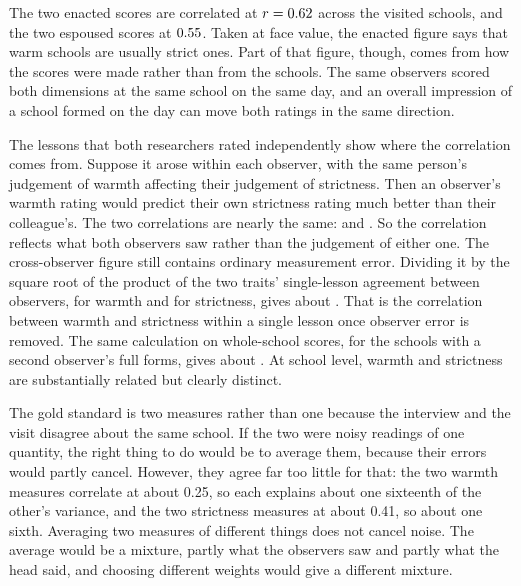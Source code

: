 The two enacted scores are correlated at $r = 0.62$ across the \NTierOne{} visited schools, and the two espoused scores at $0.55$. Taken at face value, the enacted figure says that warm schools are usually strict ones. Part of that figure, though, comes from how the scores were made rather than from the schools. The same observers scored both dimensions at the same school on the same day, and an overall impression of a school formed on the day can move both ratings in the same direction.

The lessons that both researchers rated independently show where the correlation comes from. Suppose it arose within each observer, with the same person's judgement of warmth affecting their judgement of strictness. Then an observer's warmth rating would predict their own strictness rating much better than their colleague's. The two correlations are nearly the same: \CorrWSSameObs{} and \CorrWSCrossObs{}. So the correlation reflects what both observers saw rather than the judgement of either one. The cross-observer figure still contains ordinary measurement error. Dividing it by the square root of the product of the two traits' single-lesson agreement between observers, \RelLessonW{} for warmth and \RelLessonS{} for strictness, gives about \CorrWSTrue{}. That is the correlation between warmth and strictness within a single lesson once observer error is removed. The same calculation on whole-school scores, for the \NWSSchool{} schools with a second observer's full forms, gives about \CorrWSTrueSchool{}. At school level, warmth and strictness are substantially related but clearly distinct.

The gold standard is two measures rather than one because the interview and the visit disagree about
the same school. If the two were noisy readings of one quantity, the right thing to do would be
to average them,
because their errors would partly cancel. However, they agree far too little for that: the
two warmth measures correlate at about 0.25, so each explains about one sixteenth of the other's variance, and the two strictness measures at about 0.41, so about one sixth. Averaging two measures of different things does not cancel noise. The average would be a mixture, partly what the observers saw and partly what the head said, and choosing different weights would give a different mixture.

